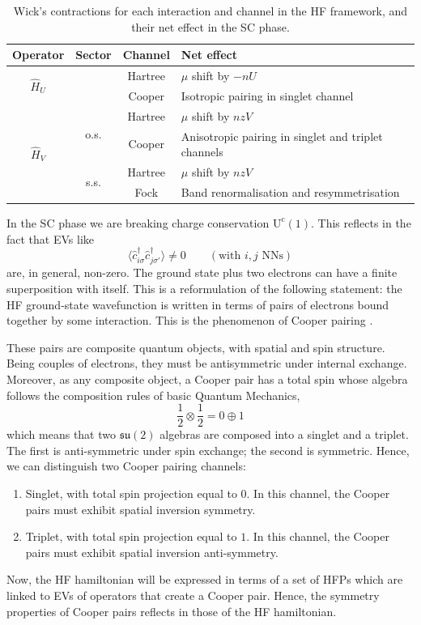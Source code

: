 \begin{table}[t]
	\centering
	\begin{tabular}{c c c l}
		\textbf{Operator} & \textbf{Sector} & \textbf{Channel} & \textbf{Net effect} \\
		\midrule
		\multirow{2}{*}{$\hat H_U$} && Hartree & $\mu$ shift by $-nU$ \\
		&& Cooper & Isotropic pairing in singlet channel \\
		\midrule
		\multirow{4}{*}{$\hat H_V$} & \multirow{2}{*}{o.s.} & Hartree & $\mu$ shift by $nzV$ \\
		&& Cooper & Anisotropic pairing in singlet and triplet channels \\[0.5em]
		& \multirow{2}{*}{s.s.} & Hartree & $\mu$ shift by $nzV$ \\
		&& Fock & Band renormalisation and resymmetrisation \\
		\midrule
	\end{tabular}
	\caption{Wick's contractions for each interaction and channel in the HF framework, and their net effect in the SC phase.}
	\label{tab:sc-RWCs}
\end{table}

In the SC phase we are breaking charge conservation $\mathrm{U}^\mathrm{c}(1)$. This reflects in the fact that EVs like
\[
	\big\langle
	\hat c_{i\sigma}^\dagger \hat c_{j\sigma'}^\dagger \rangle \neq 0
	\qquad
	(\text{with $i,j$ NNs})
\]
are, in general, non-zero. The ground state plus two electrons can have a finite superposition with itself. This is a reformulation of the following statement: the HF ground-state wavefunction is written in terms of pairs of electrons bound together by some interaction. This is the phenomenon of Cooper pairing \cite{coleman2015introduction}.

These pairs are composite quantum objects, with spatial and spin structure. Being couples of electrons, they must be antisymmetric under internal exchange. Moreover, as any composite object, a Cooper pair has a total spin whose algebra follows the composition rules of basic Quantum Mechanics,
\[
	\frac 1 2 \otimes \frac 1 2 = 0 \oplus 1
\]
which means that two $\mathfrak{su}(2)$ algebras are composed into a singlet and a triplet. The first is anti-symmetric under spin exchange; the second is symmetric. Hence, we can distinguish two Cooper pairing channels:
\begin{enumerate}
	\item Singlet, with total spin projection equal to $0$. In this channel, the Cooper pairs must exhibit spatial inversion symmetry.
	\item Triplet, with total spin projection equal to $1$. In this channel, the Cooper pairs must exhibit spatial inversion anti-symmetry.
\end{enumerate}
Now, the HF hamiltonian will be expressed in terms of a set of HFPs which are linked to EVs of operators that create a Cooper pair. Hence, the symmetry properties of Cooper pairs reflects in those of the HF hamiltonian.

